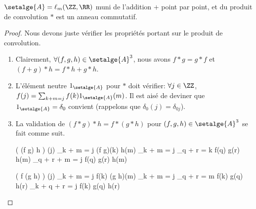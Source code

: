 
\begin{fact}
	$\setalge{A} = \ell_{\small m}(\ZZ , \RR)$
	muni de l'addition $+$ point par point, et du produit de convolution $\ast$
	est un anneau commutatif.
\end{fact}


\begin{proof}
	Nous devons juste vérifier les propriétés portant sur le produit de convolution.
	\begin{enumerate}
		\item Clairement,
		$\forall (f,g,h) \in \setalge{A}^3$, nous avons
		$f \ast g = g \ast f$
		et
		$(f + g) \ast h = f \ast h + g \ast h$.


		\item L'élément neutre $1_{\setalge{A}}$ pour $\ast$ doit vérifier:
		$\forall j \in \ZZ$,
		$f(j) = \sum_{k + m = j} f(k) 1_{\setalge{A}}(m)$.
		Il est aisé de deviner que $1_{\setalge{A}} = \delta_0$ convient
		(rappelons que $\delta_{0}(j) = \delta_{0j}$).


		\item La validation de
		$(f \ast g) \ast h = f \ast (g \ast h)$
		pour
		$(f,g,h) \in \setalge{A}^3$
		se fait comme suit.

		\begin{multicols}{2}
        	\setlength{\columnseprule}{.75pt}
	
	
    		\begin{stepcalc}[style=ar*]
    			\big( (f \ast g) \ast h \big) (j)
    		\explnext{}
    			\dsum_{k + m = j} (f \ast g)(k) h(m)
    		\explnext{}
    			\dsum_{k + m = j} \dsum_{q + r = k} f(q) g(r) h(m)
    		\explnext{}
    			\dsum_{q + r + m = j} f(q) g(r) h(m)
    		\end{stepcalc}
	
	
    		\begin{stepcalc}[style=ar*]
    			\big( f \ast (g \ast h) \big) (j)
    		\explnext{}
    			\dsum_{k + m = j} f(k) (g \ast h)(m)
    		\explnext{}
    			\dsum_{k + m = j} \dsum_{q + r = m} f(k) g(q) h(r)
    		\explnext{}
    			\dsum_{k + q + r = j} f(k) g(q) h(r)
    		\end{stepcalc}
    	\end{multicols}
	\end{enumerate}

	\null\vspace{-8ex}
\end{proof}




